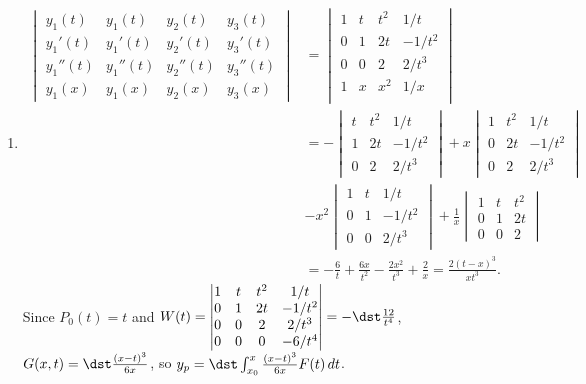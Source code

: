 \documentclass[openany]{book}
\newenvironment{sectionSolutions}{
 \begin{enumerate}[item-label={\thesection.\arabic{enumi}.}]
}{
 \end{enumerate}
}
\begin{document}
\begin{sectionSolutions}
\item
\begin{align*}
\begin{vmatrix}
y_1(t)&y_1(t)&y_2(t)&y_3(t)\\
y_1'(t)&y_1'(t)&y_2'(t)&y_3'(t)\\
y_1''(t)&y_1''(t)&y_2''(t)&y_3''(t)\\
y_1(x)&y_1(x)&y_2(x)&y_3(x)
\end{vmatrix}&=
\begin{vmatrix}
1&t&t^2&1/t\\
0&1&2t&-1/t^2\\
0&0&2&2/t^3\\
1&x&x^2&1/x\\
\end{vmatrix}\\
&=-\begin{vmatrix}
t&t^2&1/t\\
1&2t&-1/t^2\\
0&2&2/t^3\end{vmatrix}
+x\begin{vmatrix}
1&t^2&1/t\\
0&2t&-1/t^2\\
0&2&2/t^3
\end{vmatrix}\\
&-x^2\begin{vmatrix}
1&t&1/t\\0&1&-1/t^2\\
0&0&2/t^3\end{vmatrix}
+\frac{1}{ x}\begin{vmatrix}
1&t&t^2\\0&1&2t\\0&0&2\end{vmatrix}\\
&=-\frac{6}{ t}+\frac{6x}{ t^2}-\frac{2x^2}{ t^3}+\frac{2}{ x}
=\frac{2(t-x)^3}{ xt^3}.
\end{align*}
Since $P_0(t)=t$ and
$W(t)=\begin{vmatrix}
1&t&t^2&1/t\\
0&1&2t&-1/t^2\\
0&0&2&2/t^3\\
0&0&0&-6/t^4
\end{vmatrix}=-\dst\frac{12}{ t^4}$,
$G(x,t)=\dst\frac{(x-t)^3}{6x}$, so
$y_p=\dst\int_{x_0}^x \frac{(x-t)^3}{6x}F(t)\,dt$.




\end{sectionSolutions}
\end{document}
